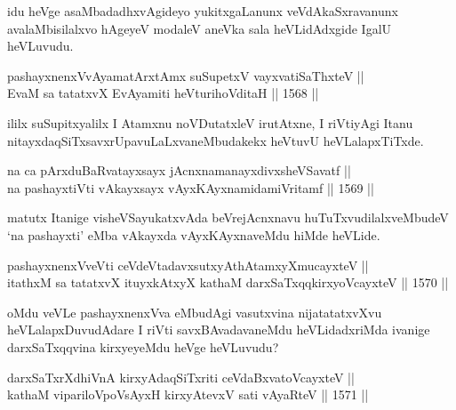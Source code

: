 \begin{artha}
idu heVge asaMbadadhxvAgideyo yukitxgaLanunx veVdAkaSxravanunx avalaMbisilalxvo hAgeyeV modaleV aneVka sala heVLidAdxgide IgalU heVLuvudu.
\end{artha}


\begin{shl}
pashayxnenxVvAyamatArx\s \s tAmx suSupetxV vayxvatiSaThxteV ||  \\
EvaM sa tatatxvX EvAyamiti heVturihoVditaH ||  1568 ||  
\end{shl}

\begin{artha}
ililx suSupitxyalilx I Atamxnu noVDutatxleV irutAtxne, I riVtiyAgi Itanu nitayxdaqSiTxsavxrUpavuLaLxvaneMbudakekx heVtuvU heVLalapxTiTxde.
\end{artha}

\begin{shl}
na ca pArxduBaRvatayxsayx jAcnxnamanayxdivxsheVSavatf ||  \\
na pashayxtiVti vAkayxsayx vAyxKAyxnamidamiVritamf ||  1569 ||  
\end{shl}

\begin{artha}
matutx Itanige visheVSayukatxvAda beVrejAcnxnavu huTuTxvudilalxveMbudeV `na pashayxti' eMba vAkayxda vAyxKAyxnaveMdu hiMde heVLide.
\end{artha}

\begin{shl}
pashayxnenxVveVti ceVdeVtadavxsutxyAthAtamxyXmucayxteV || \\
itathxM sa tatatxvX ituyxkAtxyX kathaM darxSaTxqqkirxyoVcayxteV ||  1570 ||  
\end{shl}

\begin{artha}
oMdu veVLe pashayxnenxVva eMbudAgi vasutxvina nijatatatxvXvu heVLalapxDuvudAdare I riVti savxBAvadavaneMdu heVLidadxriMda ivanige darxSaTxqqvina kirxyeyeMdu heVge heVLuvudu? 
\end{artha}


\begin{shl}
darxSaTxrXdhiVnA kirxyAdaqSiTxriti ceVdaBxvatoVcayxteV ||  \\
kathaM vipariloVpoV\s sAyxH kirxyAtevxV sati vAyaRteV ||  1571 ||  
\end{shl}

